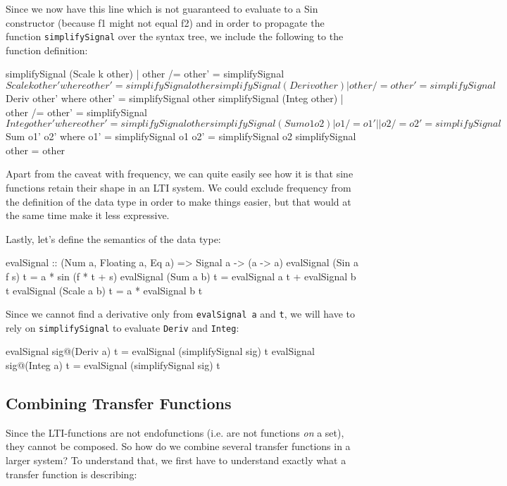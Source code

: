 Since we now have this line which is not guaranteed to evaluate to a Sin constructor (because f1 might not equal f2) and in order to propagate the function \texttt{simplifySignal} over the syntax tree, we include the following to the function definition:
\begin{code}
simplifySignal (Scale k other)
  | other /= other' = simplifySignal $ Scale k other' where 
             other' = simplifySignal other
simplifySignal (Deriv other)
  | other /= other' = simplifySignal $ Deriv   other' where 
             other' = simplifySignal other
simplifySignal (Integ other)
  | other /= other' = simplifySignal $ Integ   other' where 
             other' = simplifySignal other
simplifySignal (Sum o1 o2)
  | o1 /= o1' || o2 /= o2' = simplifySignal $ Sum o1' o2' where
    o1' = simplifySignal o1
    o2' = simplifySignal o2
simplifySignal other = other
\end{code}
Apart from the caveat with frequency, we can quite easily see how it is that sine functions retain their shape in an LTI system. We could exclude frequency from the definition of the data type in order to make things easier, but that would at the same time make it less expressive.

Lastly, let's define the semantics of the data type:
\begin{code}
evalSignal :: (Num a, Floating a, Eq a) => Signal a -> (a -> a)
evalSignal     (Sin a f s) t = a * sin (f * t + s)
evalSignal     (Sum   a b) t = evalSignal a t + evalSignal b t
evalSignal     (Scale a b) t = a * evalSignal b t
\end{code}
Since we cannot find a derivative only from \texttt{evalSignal a} and \texttt{t}, we will have to rely on \texttt{simplifySignal} to evaluate \texttt{Deriv} and \texttt{Integ}:
\begin{code}
evalSignal sig@(Deriv a)   t = evalSignal (simplifySignal sig) t
evalSignal sig@(Integ a)   t = evalSignal (simplifySignal sig) t
\end{code}



\subsection{Combining Transfer Functions}\label{sec:comb}
Since the LTI-functions are not endofunctions (i.e. are not functions \textit{on} a set), they cannot be composed. So how do we combine several transfer functions in a larger system? To understand that, we first have to understand exactly what a transfer function is describing:

